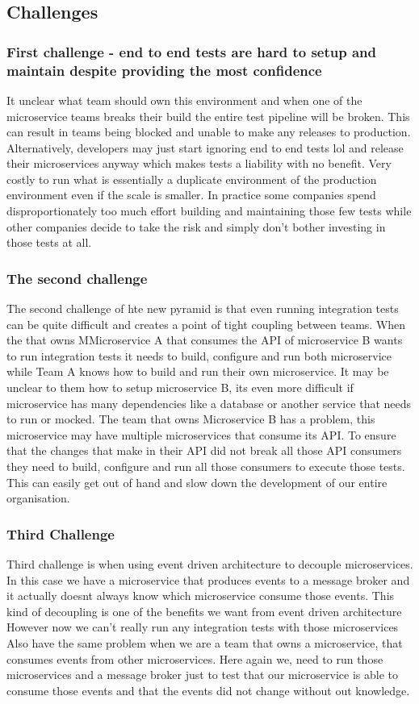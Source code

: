 \subsection{Challenges}

\subsubsection{First challenge - end to end tests are hard to setup and maintain despite providing the most confidence}
It unclear what team should own this environment and when one of the microservice teams breaks their build the entire test pipeline will be broken.
This can result in teams being blocked and unable to make any releases to production.
Alternatively, developers may just start ignoring end to end tests lol and release their microservices anyway which makes tests a liability with no benefit.
Very costly to run what is essentially a duplicate environment of the production environment even if the scale is smaller.
In practice some companies spend disproportionately too much effort building and maintaining those few tests while other companies decide to take the risk and simply don't bother investing in those tests at all.

\subsubsection{The second challenge}
The second challenge of hte new pyramid is that even running integration tests can be quite difficult and creates a point of tight coupling between teams.
When the that owns MMicroservice A that consumes the API of microservice B wants to run integration tests it needs to build, configure and run both microservice while Team A knows how to build and run their own microservice.
It may be unclear to them how to setup microservice B, its even more difficult if microservice has many dependencies like a database or another service that needs to run or mocked.
The team that owns Microservice B has a problem, this microservice may have multiple microservices that consume its API.
To ensure that the changes that make in their API did not break all those API consumers they need to build, configure and run all those consumers to execute those tests.
This can easily get out of hand and slow down the development of our entire organisation.

\subsubsection{Third Challenge}
Third challenge is when using event driven architecture to decouple microservices.
In this case we have a microservice that produces events to a message broker and it actually doesnt always know which microservice consume those events.
This kind of decoupling is one of the benefits we want from event driven architecture
However now we can't really run any integration tests with those microservices
Also have the same problem when we are a team that owns a microservice, that consumes events from other microservices.
Here again we, need to run those microservices and a message broker just to test that our microservice is able to consume those events and that the events did not change without out knowledge.

